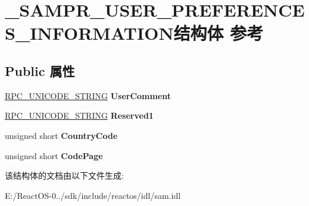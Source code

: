 \hypertarget{struct___s_a_m_p_r___u_s_e_r___p_r_e_f_e_r_e_n_c_e_s___i_n_f_o_r_m_a_t_i_o_n}{}\section{\+\_\+\+S\+A\+M\+P\+R\+\_\+\+U\+S\+E\+R\+\_\+\+P\+R\+E\+F\+E\+R\+E\+N\+C\+E\+S\+\_\+\+I\+N\+F\+O\+R\+M\+A\+T\+I\+O\+N结构体 参考}
\label{struct___s_a_m_p_r___u_s_e_r___p_r_e_f_e_r_e_n_c_e_s___i_n_f_o_r_m_a_t_i_o_n}
\subsection*{Public 属性}
\begin{DoxyCompactItemize}
\item 
\mbox{\label{struct___s_a_m_p_r___u_s_e_r___p_r_e_f_e_r_e_n_c_e_s___i_n_f_o_r_m_a_t_i_o_n_a7be8a955b121ea1d64f920c2d3323a7d}} 
\hyperlink{struct___r_p_c___u_n_i_c_o_d_e___s_t_r_i_n_g}{R\+P\+C\+\_\+\+U\+N\+I\+C\+O\+D\+E\+\_\+\+S\+T\+R\+I\+NG} {\bfseries User\+Comment}
\item 
\mbox{\label{struct___s_a_m_p_r___u_s_e_r___p_r_e_f_e_r_e_n_c_e_s___i_n_f_o_r_m_a_t_i_o_n_a7c9b94b8fbcc8bb0da159e9fdaf2bfe3}} 
\hyperlink{struct___r_p_c___u_n_i_c_o_d_e___s_t_r_i_n_g}{R\+P\+C\+\_\+\+U\+N\+I\+C\+O\+D\+E\+\_\+\+S\+T\+R\+I\+NG} {\bfseries Reserved1}
\item 
\mbox{\label{struct___s_a_m_p_r___u_s_e_r___p_r_e_f_e_r_e_n_c_e_s___i_n_f_o_r_m_a_t_i_o_n_af3a2838835cd46335e385d402c53e461}} 
unsigned short {\bfseries Country\+Code}
\item 
\mbox{\label{struct___s_a_m_p_r___u_s_e_r___p_r_e_f_e_r_e_n_c_e_s___i_n_f_o_r_m_a_t_i_o_n_ae0c8d2ccad16bab826f70a1b21af6e69}} 
unsigned short {\bfseries Code\+Page}
\end{DoxyCompactItemize}


该结构体的文档由以下文件生成\+:\begin{DoxyCompactItemize}
\item 
E\+:/\+React\+O\+S-\/0../sdk/include/reactos/idl/sam.\+idl\end{DoxyCompactItemize}
